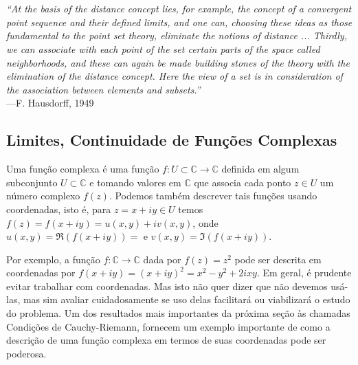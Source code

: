 \chapter[Semana 3]{}
\chaptermark{}



\hfill%
\begin{minipage}{12cm}
	\begin{flushright}
		\rightskip=0.5cm
		\textit{``At the basis of the distance concept lies, for example, 
		the concept of a convergent point sequence and their defined limits,
		and one can, choosing these ideas as those fundamental to the point 
		set theory, eliminate the notions of distance ... Thirdly, 
		we can associate with each point of the set certain parts of the space
		called neighborhoods, and these can again be made building stones of the 
		theory with the elimination of the distance concept. Here the view
		of a set is in consideration of the association between elements and
		subsets.''}
		\\[0.1cm]
		\rightskip=0.5cm
		---F. Hausdorff, 1949
	\end{flushright}
\end{minipage}




\section{Limites, Continuidade de Funções Complexas}

Uma função complexa é uma função $f:U\subset \mathbb{C}\to\mathbb{C}$ definida em algum 
subconjunto $U\subset \mathbb{C}$ e tomando valores em $\mathbb{C}$
que associa cada ponto $z\in U$ um número complexo $f(z)$.
Podemos também descrever tais funções usando coordenadas, isto é,
para $z=x+iy\in U$ temos 
$f(z)=f(x+iy)=u(x,y)+iv(x,y)$, onde $u(x,y)=\Re(f(x+iy))=$ e $v(x,y)=\Im(f(x+iy))$.


Por exemplo, a função $f:\mathbb{C}\to\mathbb{C}$ dada por $f(z)=z^2$ pode ser
descrita em coordenadas por 
$f(x+iy) = (x+iy)^2 = x^2-y^2+2ixy$.
Em geral, é prudente evitar trabalhar com coordenadas. 
Mas isto não quer dizer que não devemos usá-las, mas sim 
avaliar cuidadosamente se uso delas facilitará ou viabilizará o estudo 
do problema. Um dos resultados mais importantes da próxima seção
às chamadas Condições de Cauchy-Riemann, fornecem um exemplo 
importante de como a descrição de uma função complexa em termos de suas coordenadas
pode ser poderosa. 

